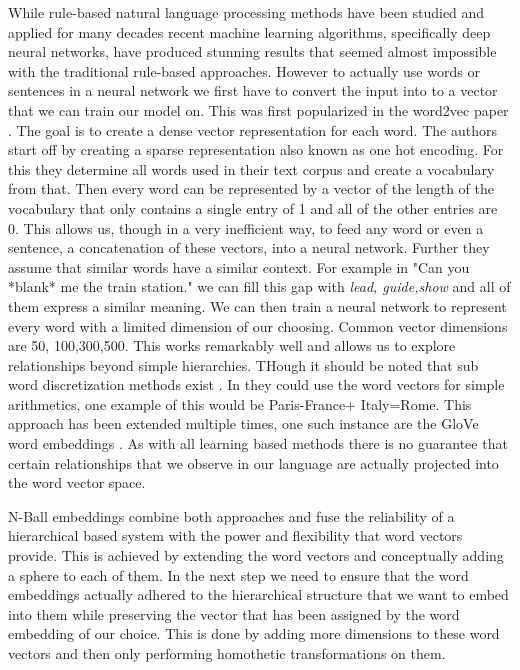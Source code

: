 \documentclass[]{article}
\begin{document}
While rule-based natural language processing methods have been studied and applied for many decades recent machine learning algorithms, specifically deep neural networks, have produced stunning results that seemed almost impossible with the traditional rule-based approaches. However to actually use words or sentences in a neural network we first have to convert the input into to a vector that we can train our model on. This was first popularized in the word2vec paper \cite{mikolov2013efficient}. The goal is to create a dense vector representation for each word. The authors start off by creating a sparse representation also known as one hot encoding. For this they determine all words used in their text corpus and create a vocabulary from that. Then every word can be represented by a vector of the length of the vocabulary that only contains a single entry of 1 and all of the other entries are 0. This allows us, though in a very inefficient way, to feed any word or even a sentence, a concatenation of these vectors, into a neural network. Further they assume that similar words have a similar context. For example in "Can you *blank* me the train station." we can fill this gap with \textit{lead, guide,show} and all of them express a similar meaning. We can then train a neural network to represent every word with a limited dimension of our choosing. Common vector dimensions are 50, 100,300,500. This works remarkably well and allows us to explore relationships beyond simple hierarchies. THough it should be noted that sub word discretization methods exist \cite{DBLP:journals/corr/abs-1801-06146}. In  \cite{mikolov2013efficient} they could use the word vectors for simple arithmetics, one example of this would be Paris-France+ Italy=Rome. This approach has been extended multiple times, one such instance are the GloVe word embeddings \cite{pennington-etal-2014-glove}. As with all learning based methods there is no guarantee that certain relationships that we observe in our language are actually projected into the word vector space. 



N-Ball embeddings combine both approaches and fuse the reliability of a hierarchical based system with the power and flexibility that  word vectors provide. This is achieved by extending the word vectors and conceptually adding a sphere to each of them. In the next step we need to ensure that the word embeddings actually adhered to the hierarchical structure that we want to embed into them while preserving the vector that has been assigned by the word embedding of our choice. This is done by adding more dimensions to these word vectors and then only performing homothetic transformations on them.
\end{document}
